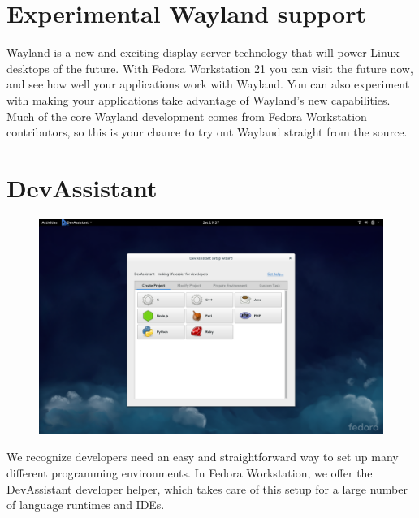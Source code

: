 \documentclass[
a4paper,
10pt
]{leaflet}
\begin{document}
\section{\textcolor{FedoraBlue}{Experimental Wayland support}}
Wayland is a new and exciting display server technology that will power Linux desktops of the future. With Fedora Workstation 21 you can visit the future now, and see how well your applications work with Wayland. You can also experiment with making your applications take advantage of Wayland's new capabilities. Much of the core Wayland development comes from Fedora Workstation contributors, so this is your chance to try out Wayland straight from the source.



\section{\textcolor{FedoraBlue}{DevAssistant}}
\begin{figure}[h]
  \includegraphics[keepaspectratio,width=\textwidth]{Fedora_devassistant.png}
\end{figure}
We recognize developers need an easy and straightforward way to set up many different programming environments. In Fedora Workstation, we offer the DevAssistant developer helper, which takes care of this setup for a large number of language runtimes and IDEs.
\end{document}
